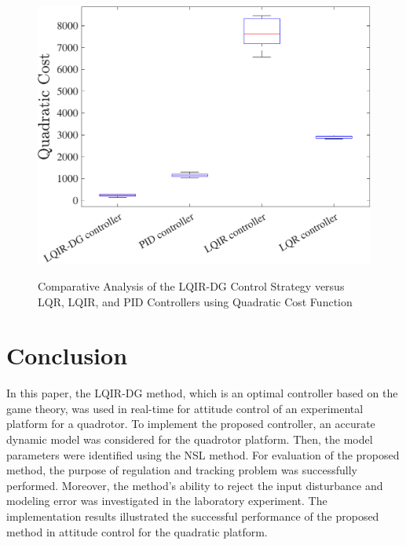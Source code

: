 \documentclass[preprint,12pt,authoryear]{elsarticle}
\begin{document}
\begin{figure}[H]
	\centering
	{\includegraphics[width=.49\linewidth]{../Figure/implementation/box_plot/lqidgvsboxplot}
	}
	\caption{Comparative Analysis of the LQIR-DG Control Strategy versus LQR, LQIR, and PID Controllers using Quadratic Cost Function}
	\label{fig:compare_boxplot}
\end{figure}
\section{Conclusion}\label{sec:conclusion}
\noindent In this paper, the LQIR-DG method, which is an optimal controller based on the game theory, was used in real-time for attitude control of an experimental platform for a quadrotor. %
To implement the proposed controller, an accurate dynamic model was considered for the quadrotor platform.
Then, the model parameters were identified using the NSL method.
For evaluation of the proposed method, the purpose of regulation and tracking problem was successfully performed.
Moreover, the method's ability to reject the input disturbance and modeling error was investigated in the laboratory experiment.
The implementation results illustrated the successful performance of the proposed method in attitude control for the quadratic platform.


  
 





\end{document}
